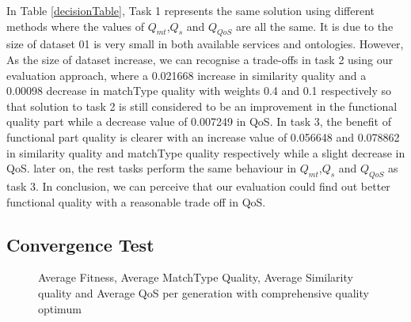 \documentclass{llncs}
\begin{document}
In Table \ref{decisionTable}, Task 1 represents the same solution using different methods where the values of $Q_{mt}$,$Q_{s}$ and $Q_{QoS}$ are all the same. It is due to the size of dataset 01 is very small in both available services and ontologies. However, As the size of dataset increase, we can recognise a trade-offs in task 2 using our evaluation approach, where a 0.021668 increase in similarity quality and a 0.00098 decrease in matchType quality with weights 0.4 and 0.1 respectively so that solution to task 2 is still considered to be an improvement in the functional quality part while a decrease value of 0.007249 in QoS. In task 3, the benefit of functional part quality is clearer with an increase value of 0.056648 and 0.078862 in  similarity quality and matchType quality respectively while a slight decrease in QoS. later on, the rest tasks perform the same behaviour in $Q_{mt}$,$Q_{s}$ and $Q_{QoS}$ as task 3. In conclusion, we can perceive that our evaluation could find out better functional quality with a reasonable trade off in QoS.


\subsection{Convergence Test}\label{convergenceTest}

\begin{figure}[h]
\centerline{
}
 \caption{Average Fitness, Average MatchType Quality, Average Similarity quality and Average QoS per generation with comprehensive quality optimum}
 \label{exp_fitnessvalue}
\end{figure}
\end{document}
